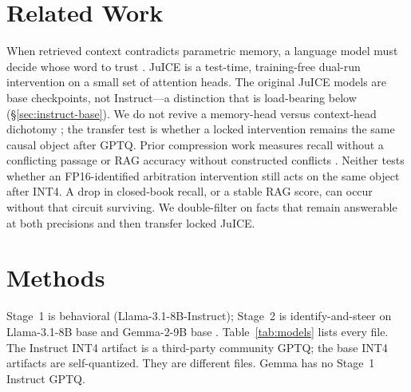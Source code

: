 \documentclass{article} %
\begin{document}
\section{Related Work}
\label{sec:related}

When retrieved context contradicts parametric memory, a language model must decide whose word to trust \citep{xie2024adaptive}. JuICE \citep{li2025taming} is a test-time, training-free dual-run intervention on a small set of attention heads. The original JuICE models are base checkpoints, not Instruct---a distinction that is load-bearing below (\S\ref{sec:instruct-base}). We do not revive a memory-head versus context-head dichotomy \citep{jin2024tug}; the transfer test is whether a locked intervention remains the same causal object after GPTQ. Prior compression work measures recall without a conflicting passage \citep{wang2026compressed} or RAG accuracy without constructed conflicts \citep{yazan2024rag}. Neither tests whether an FP16-identified arbitration intervention still acts on the same object after INT4. A drop in closed-book recall, or a stable RAG score, can occur without that circuit surviving. We double-filter on facts that remain answerable at both precisions and then transfer locked JuICE.

\section{Methods}
\label{sec:methods}

Stage~1 is behavioral (Llama-3.1-8B-Instruct); Stage~2 is identify-and-steer on Llama-3.1-8B base and Gemma-2-9B base \citep{team2024gemma2,grattafiori2024llama}. Table~\ref{tab:models} lists every file. The Instruct INT4 artifact is a third-party community GPTQ; the base INT4 artifacts are self-quantized. They are different files. Gemma has no Stage~1 Instruct GPTQ.
\end{document}
